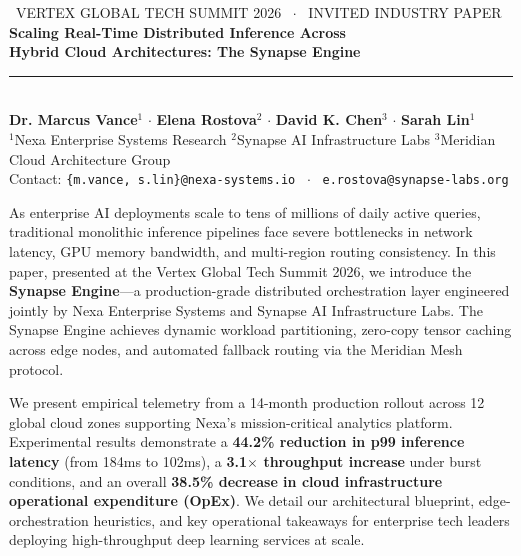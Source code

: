 \documentclass[10pt, a4paper]{article}
\begin{document}
\begin{tcolorbox}[
  enhanced,
  colback=SummitNavy,
  colframe=SummitNavy,
  arc=4pt,
  top=16pt,
  bottom=16pt,
  left=16pt,
  right=16pt
]
  \begin{center}
    {\small\sffamily\scshape\textcolor{SummitTeal}{\faMicrochip\ VERTEX GLOBAL TECH SUMMIT 2026 \ $\cdot$ \ INVITED INDUSTRY PAPER}} \\[8pt]
    {\LARGE\bfseries\color{white} Scaling Real-Time Distributed Inference Across\\[4pt] Hybrid Cloud Architectures: The Synapse Engine} \\[12pt]
    \textcolor{SummitBorder}{\rule{0.8\textwidth}{0.5pt}} \\[10pt]
    {\small\sffamily\color{white}
      \textbf{Dr. Marcus Vance}$^{1}$ \quad $\cdot$ \quad
      \textbf{Elena Rostova}$^{2}$ \quad $\cdot$ \quad
      \textbf{David K. Chen}$^{3}$ \quad $\cdot$ \quad
      \textbf{Sarah Lin}$^{1}$
    } \\[6pt]
    {\footnotesize\sffamily\color{SummitBorder}
      $^{1}$Nexa Enterprise Systems Research \quad
      $^{2}$Synapse AI Infrastructure Labs \quad
      $^{3}$Meridian Cloud Architecture Group
    } \\[4pt]
    {\footnotesize\sffamily\color{SummitTeal}
      Contact: \texttt{\{m.vance, s.lin\}@nexa-systems.io} \ $\cdot$ \ \texttt{e.rostova@synapse-labs.org}
    }
  \end{center}
\end{tcolorbox}

\vspace{10pt}

\begin{tcolorbox}[summitbox, title=\faFile\ Executive Abstract \& Summit Summary]
  \sffamily\small
  As enterprise AI deployments scale to tens of millions of daily active queries, traditional monolithic inference pipelines face severe bottlenecks in network latency, GPU memory bandwidth, and multi-region routing consistency. In this paper, presented at the Vertex Global Tech Summit 2026, we introduce the \textbf{Synapse Engine}---a production-grade distributed orchestration layer engineered jointly by Nexa Enterprise Systems and Synapse AI Infrastructure Labs. The Synapse Engine achieves dynamic workload partitioning, zero-copy tensor caching across edge nodes, and automated fallback routing via the Meridian Mesh protocol. 

  We present empirical telemetry from a 14-month production rollout across 12 global cloud zones supporting Nexa's mission-critical analytics platform. Experimental results demonstrate a \textbf{44.2\% reduction in p99 inference latency} (from 184ms to 102ms), a \textbf{3.1$\times$ throughput increase} under burst conditions, and an overall \textbf{38.5\% decrease in cloud infrastructure operational expenditure (OpEx)}. We detail our architectural blueprint, edge-orchestration heuristics, and key operational takeaways for enterprise tech leaders deploying high-throughput deep learning services at scale.
\end{tcolorbox}
\end{document}
